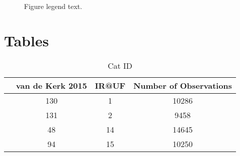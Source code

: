 \documentclass{bmcart}
\begin{document}
\begin{backmatter}
\begin{figure}[h!]
  \caption{
      Figure legend text.}
      \end{figure}
      
\section*{Tables}
\begin{table}[h!]
\caption{Cat ID}
      \begin{tabular}{cccc}
        \hline
           & van de Kerk 2015  & IR@UF   & Number of Observations\\ \hline
         & 130 & 1 & 10286\\
         & 131 & 2  & 9458\\
         & 48 & 14  & 14645\\
         & 94  & 15   & 10250\\ \hline
      \end{tabular}
\end{table}

\end{backmatter}
\end{document}

